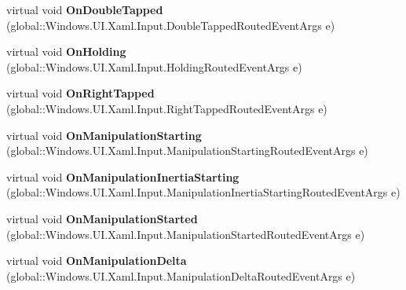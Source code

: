 \begin{DoxyCompactItemize}
virtual void {\bfseries On\+Double\+Tapped} (global\+::\+Windows.\+U\+I.\+Xaml.\+Input.\+Double\+Tapped\+Routed\+Event\+Args e)
\item 
\mbox{\label{class_windows_1_1_u_i_1_1_xaml_1_1_controls_1_1_control_a8cceeae67a7b01f8f18f30b0e6cf83c6}} 
virtual void {\bfseries On\+Holding} (global\+::\+Windows.\+U\+I.\+Xaml.\+Input.\+Holding\+Routed\+Event\+Args e)
\item 
\mbox{\label{class_windows_1_1_u_i_1_1_xaml_1_1_controls_1_1_control_addc7255a46f490ec04cc165962614c99}} 
virtual void {\bfseries On\+Right\+Tapped} (global\+::\+Windows.\+U\+I.\+Xaml.\+Input.\+Right\+Tapped\+Routed\+Event\+Args e)
\item 
\mbox{\label{class_windows_1_1_u_i_1_1_xaml_1_1_controls_1_1_control_a967a18b3578c9d2bd19a72f4a964d3a3}} 
virtual void {\bfseries On\+Manipulation\+Starting} (global\+::\+Windows.\+U\+I.\+Xaml.\+Input.\+Manipulation\+Starting\+Routed\+Event\+Args e)
\item 
\mbox{\label{class_windows_1_1_u_i_1_1_xaml_1_1_controls_1_1_control_a435a48ffc2e72a28d5a8c492fb75ee38}} 
virtual void {\bfseries On\+Manipulation\+Inertia\+Starting} (global\+::\+Windows.\+U\+I.\+Xaml.\+Input.\+Manipulation\+Inertia\+Starting\+Routed\+Event\+Args e)
\item 
\mbox{\label{class_windows_1_1_u_i_1_1_xaml_1_1_controls_1_1_control_aed97aaca4691b6260b928885e95b59a3}} 
virtual void {\bfseries On\+Manipulation\+Started} (global\+::\+Windows.\+U\+I.\+Xaml.\+Input.\+Manipulation\+Started\+Routed\+Event\+Args e)
\item 
\mbox{\label{class_windows_1_1_u_i_1_1_xaml_1_1_controls_1_1_control_ac8964a26bad230883f276d2a27377698}} 
virtual void {\bfseries On\+Manipulation\+Delta} (global\+::\+Windows.\+U\+I.\+Xaml.\+Input.\+Manipulation\+Delta\+Routed\+Event\+Args e)
\item 
\mbox{\label{class_windows_1_1_u_i_1_1_xaml_1_1_controls_1_1_control_a3304447f6f0bbb3c475cf58171d08f90}} 

\end{DoxyCompactItemize}

